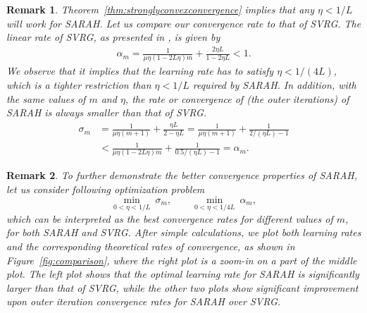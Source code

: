 \documentclass{article}
\newtheorem{remark}{Remark}
\begin{document}
\begin{remark}\label{rem1}
Theorem~\ref{thm:stronglyconvexconvergence} implies that any $\eta<1/L$ will work for SARAH. Let us compare our convergence rate to that of  SVRG. The linear rate of SVRG,  as presented in \cite{SVRG}, is given by
 \begin{align*}
\alpha_m = \tfrac{1}{\mu \eta (1 - 2 L \eta) m} + \tfrac{2 \eta L}{1 - 2 \eta L} < 1. 
\end{align*}
We  observe that it implies that the learning rate  has to satisfy $\eta < 1/(4L)$, which is a tighter restriction than $\eta<1/L$ required by SARAH. In addition, with the same values of $m$ and $\eta$, the rate or convergence of (the outer iterations) of SARAH is always smaller than that of SVRG. 
\begin{align*}
\sigma_m &= \tfrac{1}{\mu \eta (m + 1)} +  \tfrac{\eta L}{2 - \eta L} = \tfrac{1}{\mu \eta (m + 1)} +  \tfrac{1}{2/(\eta L) - 1} 
 \\%
&< \tfrac{1}{\mu \eta (1 - 2 L \eta) m} + \tfrac{1}{0.5/(\eta L) - 1}  = \alpha_m. 
\end{align*}
\end{remark}
 \begin{remark}\label{rem2}
 To further demonstrate the better  convergence properties of SARAH, let us consider following optimization problem
 $$\min_{0<\eta<1/L}\ \sigma_m,
 \qquad \min_{0<\eta<1/{4L}}\ \alpha_m,$$
 which can be interpreted as the best convergence rates for different values of $m$, for both SARAH and SVRG. After simple calculations, we 
  plot both learning rates and the corresponding theoretical rates of convergence, as shown in Figure~\ref{fig:comparison},
   where the right plot is a zoom-in on a part of the middle plot. The left plot shows that the  optimal learning rate for SARAH is significantly larger than that of  SVRG, while the other two plots show significant improvement upon outer iteration convergence rates for SARAH over SVRG.
  \end{remark}
\end{document}

